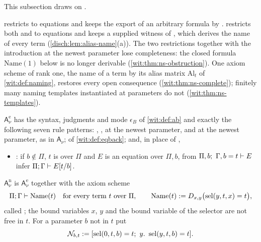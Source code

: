 This subsection draws on .

 restricts  to equations and keeps the
export of an arbitrary formula by .  
restricts both  and  to equations and keeps a
supplied witness of , which derives the name of every term
(\cref{disch:lem:alias-name}(a)).  The two restrictions together with the
introduction at the newest parameter lose completeness: the closed formula
$\mathrm{Name}(1)$ below is no longer derivable
(\cref{wit:thm:ns-obstruction}).  One axiom scheme of rank one, the name of
a term by its alias matrix $\mathrm{Al}_t$ of \cref{wit:def:naming},
restores every open consequence (\cref{wit:thm:ns-complete}); finitely many
naming templates instantiated at parameters do not
(\cref{wit:thm:ns-templates}).

\begin{definition}
\label{wit:def:ns}
$\mathsf{A}^{\mathrm e}_{\nu}$ has the syntax, judgments and mode
$\epsilon_B$ of \cref{wit:def:ab} and exactly the following seven rule
patterns: , ,  at the newest
parameter,  and  at the newest parameter, as
in $\mathsf{A}_{\nu}$;  of \cref{wit:def:eqback}; and, in
place of ,
\begin{itemize}
\item {}: if $b\notin\Pi$, $t$ is over $\Pi$ and $E$ is an
 equation over $\Pi,b$, from $\Pi,b;\ \Gamma,b=t\vdash E$ infer
 $\Pi;\Gamma\vdash E[t/b]$.
\end{itemize}
$\mathsf{A}^{\mathrm n}_{\nu}$ is $\mathsf{A}^{\mathrm e}_{\nu}$ together
with the axiom scheme
\[
 \Pi;\Gamma\vdash\mathrm{Name}(t)\quad\text{for every term $t$ over $\Pi$},
 \qquad
 \mathrm{Name}(t)\mathrel{:=}D_{x,y}\bigl(\operatorname{sel}(y,t,x)=t\bigr),
\]
called ; the bound variables $x$, $y$ and the bound variable
of the selector are not free in $t$.  For a parameter $b$ not in $t$ put
\[
 \mathcal N_{b,t}\defeq[\sel(0,t,b)=t;\ y.\ \sel(y,t,b)=t].
\]
\end{definition}


